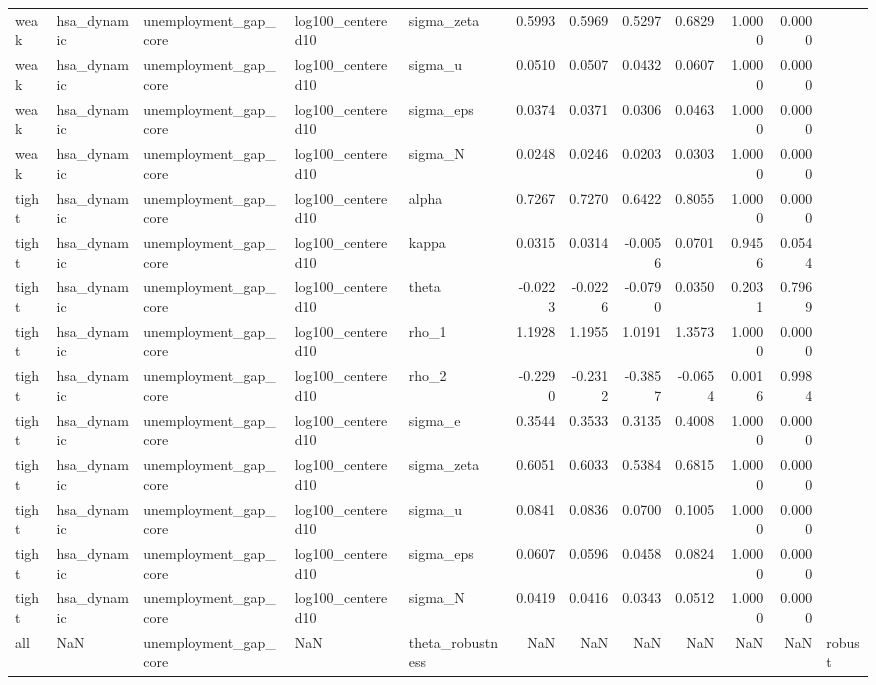 \begin{tabular}{lllllrrrrrrl}
weak & hsa\_dynamic & unemployment\_gap\_core & log100\_centered10 & sigma\_zeta & 0.5993 & 0.5969 & 0.5297 & 0.6829 & 1.0000 & 0.0000 &  \\
weak & hsa\_dynamic & unemployment\_gap\_core & log100\_centered10 & sigma\_u & 0.0510 & 0.0507 & 0.0432 & 0.0607 & 1.0000 & 0.0000 &  \\
weak & hsa\_dynamic & unemployment\_gap\_core & log100\_centered10 & sigma\_eps & 0.0374 & 0.0371 & 0.0306 & 0.0463 & 1.0000 & 0.0000 &  \\
weak & hsa\_dynamic & unemployment\_gap\_core & log100\_centered10 & sigma\_N & 0.0248 & 0.0246 & 0.0203 & 0.0303 & 1.0000 & 0.0000 &  \\
tight & hsa\_dynamic & unemployment\_gap\_core & log100\_centered10 & alpha & 0.7267 & 0.7270 & 0.6422 & 0.8055 & 1.0000 & 0.0000 &  \\
tight & hsa\_dynamic & unemployment\_gap\_core & log100\_centered10 & kappa & 0.0315 & 0.0314 & -0.0056 & 0.0701 & 0.9456 & 0.0544 &  \\
tight & hsa\_dynamic & unemployment\_gap\_core & log100\_centered10 & theta & -0.0223 & -0.0226 & -0.0790 & 0.0350 & 0.2031 & 0.7969 &  \\
tight & hsa\_dynamic & unemployment\_gap\_core & log100\_centered10 & rho\_1 & 1.1928 & 1.1955 & 1.0191 & 1.3573 & 1.0000 & 0.0000 &  \\
tight & hsa\_dynamic & unemployment\_gap\_core & log100\_centered10 & rho\_2 & -0.2290 & -0.2312 & -0.3857 & -0.0654 & 0.0016 & 0.9984 &  \\
tight & hsa\_dynamic & unemployment\_gap\_core & log100\_centered10 & sigma\_e & 0.3544 & 0.3533 & 0.3135 & 0.4008 & 1.0000 & 0.0000 &  \\
tight & hsa\_dynamic & unemployment\_gap\_core & log100\_centered10 & sigma\_zeta & 0.6051 & 0.6033 & 0.5384 & 0.6815 & 1.0000 & 0.0000 &  \\
tight & hsa\_dynamic & unemployment\_gap\_core & log100\_centered10 & sigma\_u & 0.0841 & 0.0836 & 0.0700 & 0.1005 & 1.0000 & 0.0000 &  \\
tight & hsa\_dynamic & unemployment\_gap\_core & log100\_centered10 & sigma\_eps & 0.0607 & 0.0596 & 0.0458 & 0.0824 & 1.0000 & 0.0000 &  \\
tight & hsa\_dynamic & unemployment\_gap\_core & log100\_centered10 & sigma\_N & 0.0419 & 0.0416 & 0.0343 & 0.0512 & 1.0000 & 0.0000 &  \\
all & NaN & unemployment\_gap\_core & NaN & theta\_robustness & NaN & NaN & NaN & NaN & NaN & NaN & robust \\

\end{tabular}
